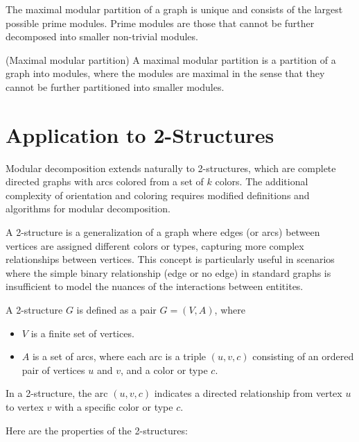 The maximal modular partition of a graph is unique and consists of the largest possible prime modules.
Prime modules are those that cannot be further decomposed into smaller non-trivial modules.

\begin{mydef}
(Maximal modular partition)
    A maximal modular partition is a partition of a graph into modules, where the modules are maximal in the sense that they cannot be further partitioned into smaller modules.
\end{mydef}


\section{Application to 2-Structures}\label{sec:application-to-2-structures}

Modular decomposition extends naturally to 2-structures, which are complete directed graphs with arcs colored from a set of $k$ colors.
The additional complexity of orientation and coloring requires modified definitions and algorithms for modular decomposition.

A 2-structure is a generalization of a graph where edges (or arcs) between vertices are assigned different colors or types, capturing more complex relationships between vertices.
This concept is particularly useful in scenarios where the simple binary relationship (edge or no edge) in standard graphs is insufficient to model the nuances of the interactions between entitites.

\begin{mydef}
    A 2-structure $G$ is defined as a pair $G = (V, A)$, where
    \begin{itemize}
        \item $V$ is a finite set of vertices.
        \item $A$ is a set of arcs, where each arc is a triple $(u, v, c)$ consisting of an ordered pair of vertices $u$ and $v$, and a color or type $c$.
    \end{itemize}
\end{mydef}

In a 2-structure, the arc $(u, v, c)$ indicates a directed relationship from vertex $u$ to vertex $v$ with a specific color or type $c$.

Here are the properties of the 2-structures:

